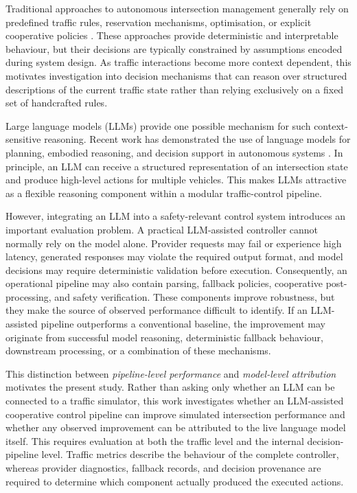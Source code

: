 \documentclass[letterpaper,10pt,conference]{ieeeconf}
\begin{document}
Traditional approaches to autonomous intersection management generally rely on predefined traffic rules, reservation mechanisms, optimisation, or explicit cooperative policies \cite{Dresner2008,Safarov2022,Zhao2025}. These approaches provide deterministic and interpretable behaviour, but their decisions are typically constrained by assumptions encoded during system design. As traffic interactions become more context dependent, this motivates investigation into decision mechanisms that can reason over structured descriptions of the current traffic state rather than relying exclusively on a fixed set of handcrafted rules.



Large language models (LLMs) provide one possible mechanism for such context-sensitive reasoning. Recent work has demonstrated the use of language models for planning, embodied reasoning, and decision support in autonomous systems \cite{Huang2022,Driess2023,Wen2023,Jin2023,Cui2024,Yang2024,Hou2025,Yang2024,Li2024}. In principle, an LLM can receive a structured representation of an intersection state and produce high-level actions for multiple vehicles. This makes LLMs attractive as a flexible reasoning component within a modular traffic-control pipeline.



However, integrating an LLM into a safety-relevant control system introduces an important evaluation problem. A practical LLM-assisted controller cannot normally rely on the model alone. Provider requests may fail or experience high latency, generated responses may violate the required output format, and model decisions may require deterministic validation before execution. Consequently, an operational pipeline may also contain parsing, fallback policies, cooperative post-processing, and safety verification. These components improve robustness, but they make the source of observed performance difficult to identify. If an LLM-assisted pipeline outperforms a conventional baseline, the improvement may originate from successful model reasoning, deterministic fallback behaviour, downstream processing, or a combination of these mechanisms.



This distinction between \emph{pipeline-level performance} and \emph{model-level attribution} motivates the present study. Rather than asking only whether an LLM can be connected to a traffic simulator, this work investigates whether an LLM-assisted cooperative control pipeline can improve simulated intersection performance and whether any observed improvement can be attributed to the live language model itself. This requires evaluation at both the traffic level and the internal decision-pipeline level. Traffic metrics describe the behaviour of the complete controller, whereas provider diagnostics, fallback records, and decision provenance are required to determine which component actually produced the executed actions.
\end{document}
